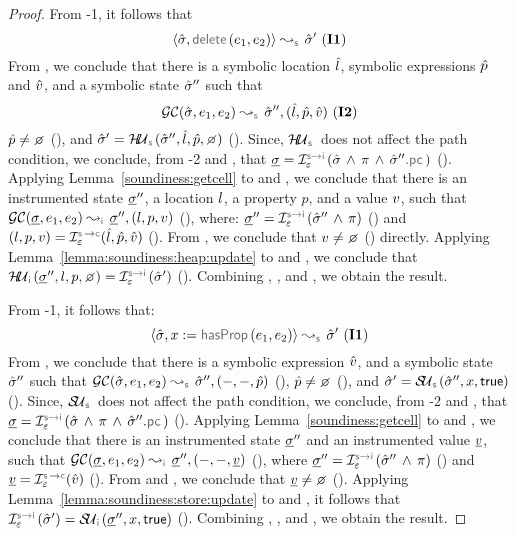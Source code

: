 \begin{proof}
\noindent {}
From \hyp{1}, it follows that 
$$\absbsemrule{\sstate, \jsildelete(\jsilexpr_1, \jsilexpr_2)}{\sstate'}{\symbolic} \text{ (\ieq{1})}$$
From , we conclude that there is a symbolic location $\hat{l}$, symbolic expressions $\hat{p}$ and $\hat{v}$, and a symbolic state $\hat{\sigma}''$ such that 
$$\absgetcellrule{\symbolic}{\sstate, \jsilexpr_1, \jsilexpr_2}{\sstate'', (\sloc, \sexprp, \sexprv)} \text{ (\ieq{2})}$$ 
$\sexprp \neq \none$ (), and  
$\sstate' = \hpupdt{\symbolic}(\sstate'', \sloc, \sexprp, \none)$ (). 
Since, $\hpupdt{\symbolic}$ does not affect the path condition, we conclude, from \hyp{2} and , that
$\istate = \interpret{\symbinst}{\senv}(\sstate \, \wedge \, \pc \, \wedge \, \sstate''.\pcsel)$ (). 
Applying Lemma~\ref{soundiness:getcell} to  and , we conclude that
there is an instrumented state $\underline{\sigma}''$, a location $l$, a property $p$, and a value $v$, such that 
$\absgetcellrule{\instrumented}{\istate, \jsilexpr_1, \jsilexpr_2}{\istate'', (\loc, p, \val)}$ (), 
where: $\istate'' = \interpret{\symbinst}{\senv}(\sstate'' \, \wedge \, \pc)$ () and 
 $(\loc, p, \val) = \interpret{\symbconc}{\senv}(\sloc, \sexprp, \sexprv)$ (). 
From , we conclude that $\val \neq \none$ () directly. 
Applying Lemma~\ref{lemma:soundiness:heap:update} to  and , we conclude that 
$ \hpupdt{\instrumented}(\istate'', \loc, p, \none) = \interpret{\symbinst}{\senv}(\sstate')$ (). 
Combining , , and , we obtain the result. 
\vspace{5pt} 

\noindent {}
From \hyp{1}, it follows that:
$$\absbsemrule{\sstate, \jvar := \hasfield(\jsilexpr_1, \jsilexpr_2)}{\sstate'}{\symbolic} \text{ (\ieq{1})}$$ 
From , we conclude that there is a symbolic expression $\hat{v}$, and a symbolic state $\hat{\sigma}''$ such that 
$\absgetcellrule{\symbolic}{\sstate, \jsilexpr_1, \jsilexpr_2}{\sstate'', (-, -, \sexprp)}$ (), $\sexprp \neq \none$ (), 
and $\sstate' = \stupdt{\symbolic}(\sstate'', \jvar, \jtrue)$ (). 
Since, $\stupdt{\symbolic}$ does not affect the path condition, we conclude, from \hyp{2} and , that
$\istate = \interpret{\symbinst}{\senv}(\sstate \, \wedge \, \pc \, \wedge \, \sstate''.\pcsel)$ ().
Applying Lemma~\ref{soundiness:getcell} to  and , we conclude that
there is an instrumented state $\underline{\sigma}''$ and an instrumented value $\underline{v}$, such that 
$\absgetcellrule{\instrumented}{\istate, \jsilexpr_1, \jsilexpr_2}{\istate'', (-, -, \ival)}$ (), 
where $\istate'' = \interpret{\symbinst}{\senv}(\sstate'' \, \wedge \, \pc)$ () and $\ival = \interpret{\symbconc}{\senv}(\sexprv)$ (). 
From  and , we conclude that $\ival \neq \none$ (). 
Applying Lemma~\ref{lemma:soundiness:store:update} to  and , it follows
that  $\interpret{\symbinst}{\senv}(\sstate') = \stupdt{\instrumented}(\istate'', \jvar, \jtrue)$ ().
Combining , , and , we obtain the result. 
\vspace{5pt} 


\end{proof}
